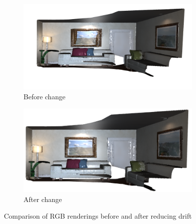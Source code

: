 \documentclass[12pt, a4paper]{article}
\begin{document}
\begin{figure}[H]
  \centering
  \begin{subfigure}[b]{0.45\textwidth}
    \includegraphics[width=\textwidth]{./results/dense_slam/rgb.png}
    \caption{Before change}
  \end{subfigure}
  \hfill
  \begin{subfigure}[b]{0.45\textwidth}
    \includegraphics[width=\textwidth]{./results/dense_slam/bonus_rgb.png}
    \caption{After change}
  \end{subfigure}
  \caption{Comparison of RGB renderings before and after reducing drift}
\end{figure}
\end{document}
